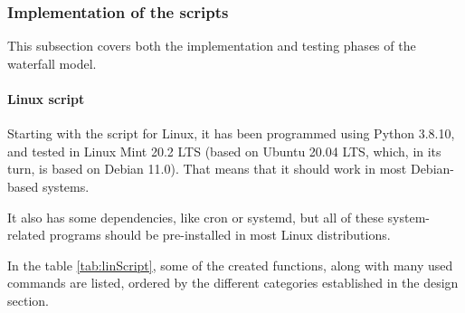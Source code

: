 \pagebreak
\subsubsection{Implementation of the scripts}
This subsection covers both the implementation and testing phases of the waterfall model.
\paragraph{Linux script}
Starting with the script for Linux, it has been programmed using Python 3.8.10, and tested in Linux Mint 20.2 LTS (based on Ubuntu 20.04 LTS, which, in its turn, is based on Debian 11.0). That means that it should work in most Debian-based systems.

It also has some dependencies, like cron or systemd, but all of these system-related programs should be pre-installed in most Linux distributions.

In the table \ref{tab:linScript}, some of the created functions, along with many used commands are listed, ordered by the different categories established in the design section.

